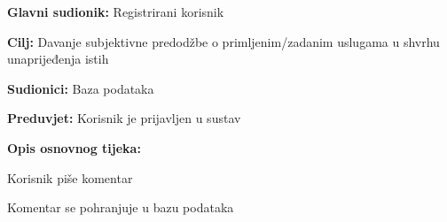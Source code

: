 \noindent {}
\begin{packed_item}
	
	\item \textbf{Glavni sudionik: } Registrirani korisnik
	\item  \textbf{Cilj:} Davanje subjektivne predodžbe o primljenim/zadanim uslugama u shvrhu unaprijeđenja istih
	\item  \textbf{Sudionici:} Baza podataka
	\item  \textbf{Preduvjet:} Korisnik je prijavljen u sustav
	\item  \textbf{Opis osnovnog tijeka:}
	
	\item[] \begin{packed_enum}
		
		\item Korisnik piše komentar 
		\item Komentar se pohranjuje u bazu podataka
	\end{packed_enum}
	
\end{packed_item}



